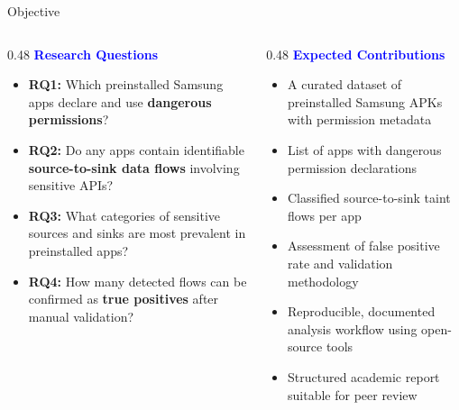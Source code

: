 \documentclass[aspectratio=169]{beamer}
\begin{document}
\begin{frame}{Objective}
\begin{columns}[T]
    \begin{column}{0.48\textwidth}
        \textbf{\textcolor{blue}{Research Questions}}
        \begin{itemize}
            \item \textbf{RQ1:} Which preinstalled Samsung apps declare and
                  use \textbf{dangerous permissions}?

            \item \textbf{RQ2:} Do any apps contain identifiable
                  \textbf{source-to-sink data flows} involving sensitive APIs?

            \item \textbf{RQ3:} What categories of sensitive sources and sinks
                  are most prevalent in preinstalled apps?

            \item \textbf{RQ4:} How many detected flows can be confirmed as
                  \textbf{true positives} after manual validation?
        \end{itemize}
    \end{column}

    \begin{column}{0.48\textwidth}
        \textbf{\textcolor{blue}{Expected Contributions}}
        \begin{itemize}
            \item A curated dataset of preinstalled Samsung APKs with
                  permission metadata
            \item List of apps with dangerous permission declarations
            \item Classified source-to-sink taint flows per app
            \item Assessment of false positive rate and validation methodology
            \item Reproducible, documented analysis workflow using
                  open-source tools
            \item Structured academic report suitable for peer review
        \end{itemize}
    \end{column}
\end{columns}
\end{frame}
\end{document}
